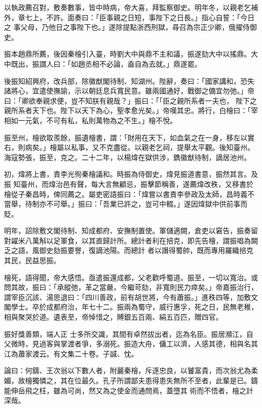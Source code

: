 \begin{pinyinscope}
 以執政薦召對，敷奏數事，皆中時病，帝大喜，拜監察御史。明年冬，以親老乞補外，章七上，不許。面奏曰：「臣事親之日短，事陛下之日長。」指心自誓：「今日之
 事父母，乃他日之事陛下也。」遂除提點浙西刑獄，尋召為宗正少卿，俄擢侍御史。



 振本趙鼎所薦，後因秦檜引入臺，時劉大中與鼎不主和議，振遂劾大中以搖鼎。大中既出，振謂人曰：「如趙丞相不必論，盍自為去就。」鼎遂罷。



 後振知紹興府，改兵部，除徽猷閣待制、知湖州。陛辭，奏曰：「國家講和，恐失諸將心，宜遣使撫諭，示以朝廷息兵寬民意。雖兩國通好，戰御之備宜勿弛。」帝曰：「卿欲奉親求便，豈不知朕有親哉？」振曰：「「臣之親所系者一夫也，
 陛下之親所系者天下也。陛下以天下為心，聖孝愈光矣。」帝嘆其忠。將行，白檜曰：「宰相如一元氣，不可有私，私則萬物為之不生。」檜不悅。



 振至州，檜欲取羨餘，振遺檜書，謂：「財用在天下，如血氣之在一身，移左以實右，則病矣。」檜屬以私事，又不克盡從。以親老乞祠，提舉太平觀。後知臺州。海寇勢張，振至，克之。二十二年，以楊煒在獄供涉，鐫徽猷待制，謫居池州。



 初，煒將上書，責李光徇秦檜議和。時振為侍御史，煒見振道書意，振然其言。及振
 知臺州，而煒治邑有聲，每大言無顧忌，振擊節稱善，遂薦煒改秩，又移書於檜從子秦昌時，俾同薦之。屬吏密語振曰：「煒嘗以書責李參政及太師，昌時義不當舉，待制亦不可舉。」振曰：「吾業已許之，豈可中輟。」遂因煒獄中供前事而貶。



 明年，詔除敷文閣待制、知成都府、安撫制置使。軍儲適闕，倉吏以窘告，振奏留對糴米八萬斛以足軍食，以其直歸計所。總計者利在掊克，即先告檜，謂振唱為闕乏之語，風御史劾振要譽，復謫池陽。而總計
 者以譖得蜀帥，既而專用羅織掊克其民，民益思振。



 檜死，語得聞，帝大感悟。亟遣振還成都，父老歡呼蜀道。振至，一切以寬治。或問其故，振曰：「承縱弛，革之當嚴，今繼苛劾，非寬則民力瘁矣。」帝嘉振治行，謂宰臣沉該、湯思退曰：「四川善政，前有胡世將，今有蕭振。」進秩四等，加敷文閣學士。卒於成都府治，年七十二。振兩為蜀守，威行惠孚，死之日，民無老稚，相與聚哭於道。遺表至，帝悼惜之，賻銀五百兩、絹五百匹，贈四官。



 振好獎善類，端人正
 士多所交識，其間有卓然拔出者，迄為名臣。振居瀕江，自父微時，見過客與掌渡者爭，多溺死。振造大舟，傭工以濟，人感其德，相與名其江為蕭家渡云。有文集二十卷。子諴、忱。



 論曰：何鑄、王次翁以下數人者，附麗秦檜，斥逐忠良，以饕富貴，而次翁尤為柔媚，故檜獨憐之，其在位最久。孔子所謂鄙夫患得患失無所不至者，此輩是已。鑄能伸岳飛之枉，雖為可尚，然又為之使金而通問焉，蓋墮其
 術而不悟者，檜之計深哉。



\end{pinyinscope}